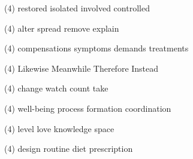 \begin{tasks}(4)
	\task restored
	\task isolated
	\task involved
	\task controlled
\end{tasks}
\item
\begin{tasks}(4)
	\task alter
	\task spread
	\task remove
	\task explain
\end{tasks}
\item
\begin{tasks}(4)
	\task compensations
	\task symptoms
	\task demands
	\task treatments
\end{tasks}
\item
\begin{tasks}(4)
	\task Likewise
	\task Meanwhile
	\task Therefore
	\task Instead
\end{tasks}
\item
\begin{tasks}(4)
	\task change
	\task watch
	\task count
	\task take
\end{tasks}
\item
\begin{tasks}(4)
	\task well-being
	\task process
	\task formation
	\task coordination
\end{tasks}
\item
\begin{tasks}(4)
	\task level
	\task love
	\task knowledge
	\task space
\end{tasks}
\item
\begin{tasks}(4)
	\task design
	\task routine
	\task diet
	\task prescription
\end{tasks}
